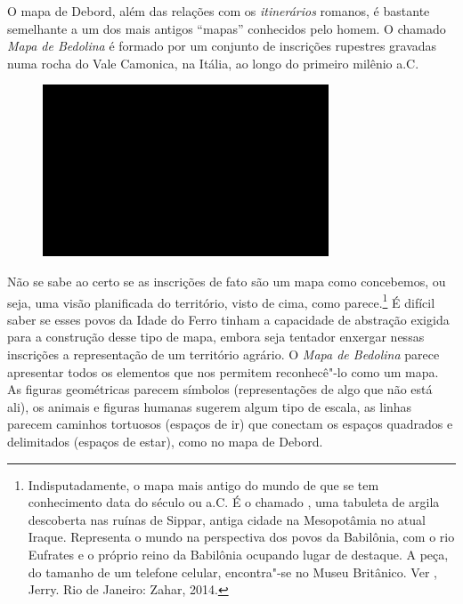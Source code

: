 O mapa de Debord, além das relações com os \emph{itinerários} romanos, é
bastante semelhante a um dos mais antigos ``mapas'' conhecidos pelo
homem. O chamado \emph{Mapa de Bedolina} é formado por um conjunto de
inscrições rupestres gravadas numa rocha do Vale Camonica, na Itália, ao
longo do primeiro milênio a.C.

\begin{figure}[!ht]
\centering
 \includegraphics[width=85mm]{./imgs/im1.jpg}
\caption{\tiny{}}
\end{figure}

Não se sabe ao certo se as inscrições de fato são um mapa como
concebemos, ou seja, uma visão planificada do território, visto de cima,
como parece.\footnote{Indisputadamente, o mapa mais antigo do mundo de
  que se tem conhecimento data do século  ou  a.C. É o chamado
  {}, uma tabuleta de argila descoberta nas ruínas de
  Sippar, antiga cidade na Mesopotâmia no atual Iraque. Representa o
  mundo na perspectiva dos povos da Babilônia, com o rio Eufrates e o
  próprio reino da Babilônia ocupando lugar de destaque. A peça, do
  tamanho de um telefone celular, encontra"-se no Museu Britânico. Ver
  , Jerry. {} Rio de
  Janeiro: Zahar, 2014.} É difícil saber se esses povos da Idade do
Ferro tinham a capacidade de abstração exigida para a construção desse
tipo de mapa, embora seja tentador enxergar nessas inscrições a
representação de um território agrário. O \emph{Mapa de Bedolina} parece
apresentar todos os elementos que nos permitem reconhecê"-lo como um
mapa. As figuras geométricas parecem símbolos (representações de algo
que não está ali), os animais e figuras humanas sugerem algum tipo de
escala, as linhas parecem caminhos tortuosos (espaços de ir) que
conectam os espaços quadrados e delimitados (espaços de estar), como no
mapa de Debord.

